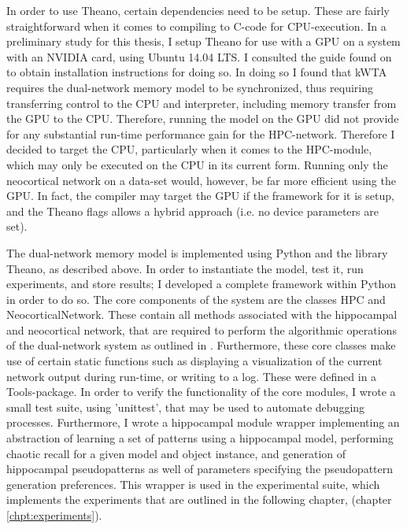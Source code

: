 In order to use Theano, certain dependencies need to be setup. These are fairly straightforward when it comes to compiling to C-code for CPU-execution. In a preliminary study for this thesis, I setup Theano for use with a GPU on a system with an NVIDIA card, using Ubuntu 14.04 LTS. I consulted the guide found on \citep{LISA-lab2015b} to obtain installation instructions for doing so. In doing so I found that kWTA requires the dual-network memory model to be synchronized, thus requiring transferring control to the CPU and interpreter, including memory transfer from the GPU to the CPU. Therefore, running the model on the GPU did not provide for any substantial run-time performance gain for the HPC-network. Therefore I decided to target the CPU, particularly when it comes to the HPC-module, which may only be executed on the CPU in its current form. Running only the neocortical network on a data-set would, however, be far more efficient using the GPU. In fact, the compiler may target the GPU if the framework for it is setup, and the Theano flags allows a hybrid approach (i.e. no device parameters are set).


The dual-network memory model is implemented using Python and the library Theano, as described above. In order to instantiate the model, test it, run experiments, and store results; I developed a complete framework within Python in order to do so. The core components of the system are the classes HPC and NeocorticalNetwork. These contain all methods associated with the hippocampal and neocortical network, that are required to perform the algorithmic operations of the dual-network system as outlined in \citep{Hattori2014}. Furthermore, these core classes make use of certain static functions such as displaying a visualization of the current network output during run-time, or writing to a log. These were defined in a Tools-package. In order to verify the functionality of the core modules, I wrote a small test suite, using 'unittest', that may be used to automate debugging processes. Furthermore, I wrote a hippocampal module wrapper implementing an abstraction of learning a set of patterns using a hippocampal model, performing chaotic recall for a given model and object instance, and generation of hippocampal pseudopatterns as well of parameters specifying the pseudopattern generation preferences. This wrapper is used in the experimental suite, which implements the experiments that are outlined in the following chapter, (chapter \ref{chpt:experiments}).

